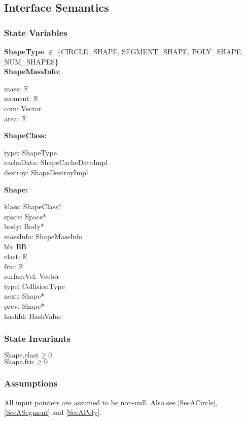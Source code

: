 \documentclass[12pt]{article}
\newcommand{\R}{$\mathbb{R}$}
\begin{document}
\subsection{Interface Semantics}

\subsubsection{State Variables} \label{SecSVShape}
	\textbf{ShapeType} $\in$ \{CIRCLE_SHAPE, SEGMENT_SHAPE, POLY_SHAPE, NUM_SHAPES\} \\
	\newpage %
	\noindent \textbf{ShapeMassInfo:}
	\begin{multicols}{2}
		\noindent mass: \R \\
		moment: \R \\
		com: Vector \\
		area: \R
	\end{multicols}
	\noindent \textbf{ShapeClass:}
	\begin{multicols}{2}
		\noindent type: ShapeType \\
		cacheData: ShapeCacheDataImpl \\
		destroy: ShapeDestroyImpl \\
	\end{multicols}
	\noindent \textbf{Shape:}
	\begin{multicols}{2}
		\noindent klass: ShapeClass* \\
		space: Space* \\
		body: Body* \\
		massInfo: ShapeMassInfo \\
		bb: BB \\
		elast: \R \\
		fric: \R \\
		surfaceVel: Vector \\
		type: CollisionType \\
		next: Shape* \\
		prev: Shape* \\
		hashId: HashValue
	\end{multicols}
	
\subsubsection{State Invariants} \label{SecSIShape}
	$\text{Shape.elast} \ge 0 $ \\
	$\text{Shape.fric} \ge 0 $ 

\subsubsection{Assumptions} \label{SecAShape}
	All input pointers are assumed to be non-null. Also see \ref{SecACircle}, \ref{SecASegment} and \ref{SecAPoly}.
	
\end{document}
